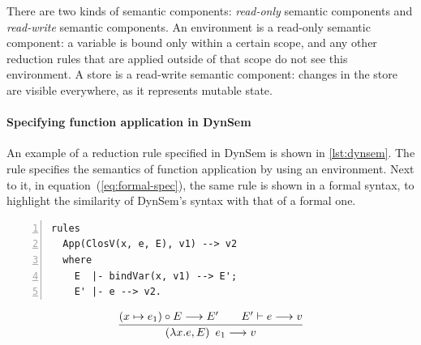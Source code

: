 There are two kinds of semantic components: \textit{read-only} semantic
components and \textit{read-write} semantic components. An environment is a
read-only semantic component: a variable is bound only within a certain scope,
and any other reduction rules that are applied outside of that scope do not see
this environment. A store is a read-write semantic component: changes in the
store are visible everywhere, as it represents mutable state.

\paragraph{Specifying function application in DynSem} An example of a reduction
rule specified in DynSem is shown in \cref{lst:dynsem}. The rule specifies the
semantics of function application by using an environment. Next to it, in
equation~(\ref{eq:formal-spec}), the same rule is shown in a formal syntax, to
highlight the similarity of DynSem's syntax with that of a formal one.

\begin{minipage}[t]{\linewidth}
\begin{minipage}{0.45\textwidth}
\begin{lstlisting}[language=dynsem,numbers=left]
rules
  App(ClosV(x, e, E), v1) --> v2
  where
    E  |- bindVar(x, v1) --> E';
    E' |- e --> v2.
\end{lstlisting}
\end{minipage}
\begin{minipage}{0.55\textwidth}
  \centering
  \begin{equation*}
    \infer{%
      \left(\lambda x.e, E\right)~e_1 \longrightarrow v%
    }{%
      (x \mapsto e_1) \circ E \longrightarrow E' &\quad E' \vdash e \longrightarrow v
    }
  \end{equation*}
\end{minipage}
\\
\begin{minipage}[t]{0.47\textwidth}
  \label{lst:dynsem}
\end{minipage}
\hspace{0.02\textwidth}
\begin{minipage}[t]{0.5\textwidth}
  \renewcommand*\figurename{Equation}
  \makeatletter
    \let\c@figure\c@equation
  \makeatother
  \label{eq:formal-spec}
\end{minipage}
\end{minipage}

